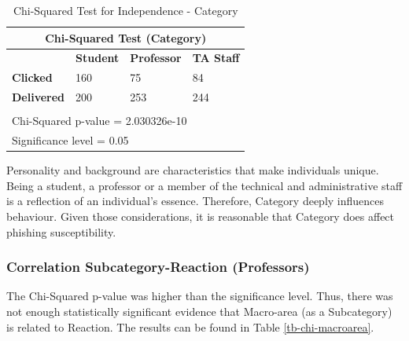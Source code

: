 \documentclass[a4paper]{article}
\begin{document}
\begingroup
\renewcommand{\arraystretch}{1.25}
\begin{table}[ht]
\begin{center}
    \begin{tabular}{ | l | l | l | l | }
    \hline
    \multicolumn{4}{|c|}{Chi-Squared Test (Category)} \\ \hline
    \textbf{} & \textbf{Student} & \textbf{Professor} & \textbf{TA Staff} \\
    \hline
    \textbf{Clicked} & 160 & 75 & 84 \\ \hline
    \textbf{Delivered} & 200 & 253 & 244 \\ \hline
    \multicolumn{4}{l}{} \\ \hline
    \multicolumn{4}{|l|}{Chi-Squared p-value = 2.030326e-10} \\
    \multicolumn{4}{|l|}{Significance level = 0.05} \\ \hline
    \end{tabular}
\end{center}
\caption{Chi-Squared Test for Independence - Category}
\label{tb-chi-category}
\end{table}

\noindent
Personality and background are characteristics that make individuals unique. Being a student, a professor or a member of the technical and administrative staff is a reflection of an individual's essence. Therefore, Category deeply influences behaviour. Given those considerations, it is reasonable that Category does affect phishing susceptibility.

\subsubsection{Correlation Subcategory-Reaction (Professors)}

The Chi-Squared p-value was higher than the significance level. Thus, there was not enough statistically significant evidence that Macro-area (as a Subcategory) is related to Reaction. The results can be found in Table \ref{tb-chi-macroarea}.

\bigskip
\end{document}
